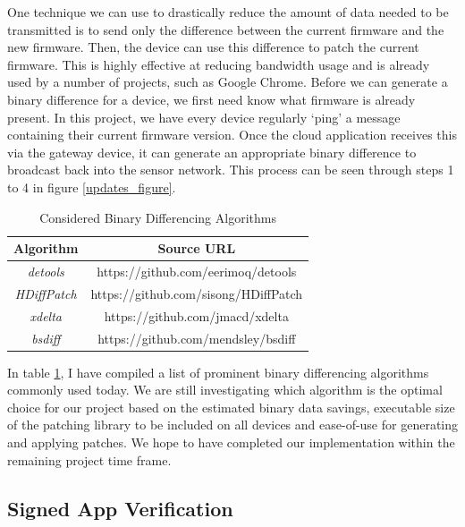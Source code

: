 \documentclass[conference]{IEEEtran}
\begin{document}
One technique we can use to drastically reduce the amount of data needed to be transmitted is to send only the difference between the current firmware and the new firmware. Then, the device can use this difference to patch the current firmware. This is highly effective at reducing bandwidth usage and is already used by a number of projects, such as Google Chrome\cite{chrome-delta-updates}. Before we can generate a binary difference for a device, we first need know what firmware is already present. In this project, we have every device regularly `ping' a message containing their current firmware version. Once the cloud application receives this via the gateway device, it can generate an appropriate binary difference to broadcast back into the sensor network. This process can be seen through steps 1 to 4 in figure \ref{updates_figure}.

\begin{table}[ht]
\caption{Considered Binary Differencing Algorithms}
\begin{center}
\begin{tabular}{|c|c|}
\hline
\textbf{Algorithm} & \textbf{Source URL}\\
\hline
\textit{detools} & https://github.com/eerimoq/detools \\
\hline
\textit{HDiffPatch} & https://github.com/sisong/HDiffPatch \\
\hline
\textit{xdelta} & https://github.com/jmacd/xdelta \\
\hline
\textit{bsdiff} & https://github.com/mendsley/bsdiff \\
\hline
\end{tabular}
\label{difference_table}
\end{center}
\end{table}

In table \ref{difference_table}, I have compiled a list of prominent binary differencing algorithms commonly used today. We are still investigating which algorithm is the optimal choice for our project based on the estimated binary data savings, executable size of the patching library to be included on all devices and ease-of-use for generating and applying patches. We hope to have completed our implementation within the remaining project time frame.

\subsection{Signed App Verification}
\end{document}
